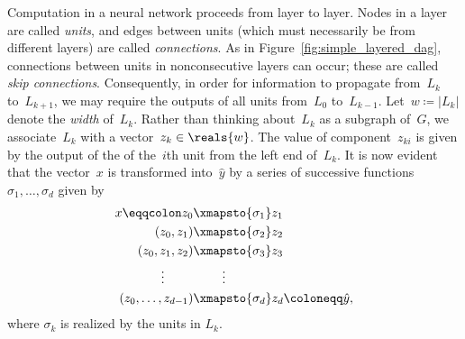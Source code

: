 \documentclass[11pt,a4paper]{article}
\numberwithin{equation}{section}
\begin{document}
Computation in a neural network proceeds from layer to layer. Nodes in a layer
are called \emph{units}, and edges between units (which must necessarily be from
different layers) are called \emph{connections}. As in
Figure~\ref{fig:simple_layered_dag}, connections between units in nonconsecutive
layers can occur; these are called \emph{skip connections}. Consequently, in
order for information to propagate from~$L_k$ to~$L_{k + 1}$, we may require the
outputs of all units from~$L_0$ to~$L_{k - 1}$. Let~$w \coloneqq |L_k|$ denote
the \emph{width} of~$L_k$. Rather than thinking about~$L_k$ as a subgraph
of~$G$, we associate~$L_k$ with a vector~$z_k \in \reals{w}$. The value of
component~$z_{ki}$ is given by the output of the of the~$i$th unit from the left
end of~$L_k$. It is now evident that the vector~$x$ is transformed
into~$\hat{y}$ by a series of successive functions~$\sigma_1, \ldots, \sigma_d$
given by
\begin{align}
\begin{split}
	x \eqqcolon z_0 &\xmapsto{\sigma_1} z_1 \\
	(z_0, z_1) &\xmapsto{\sigma_2} z_2 \\
	(z_0, z_1, z_2) &\xmapsto{\sigma_3} z_3 \\
	\vdots\hspace{0.8cm} &\hphantom{\mapsto{\sigma_3}} \vdots \\
	(z_0, \ldots, z_{d - 1}) &\xmapsto{\sigma_d} z_d \coloneqq \hat{y},
\end{split}
\label{eq:forward_propagation}
\end{align}
where $\sigma_k$ is realized by the units in $L_k$.
\end{document}
